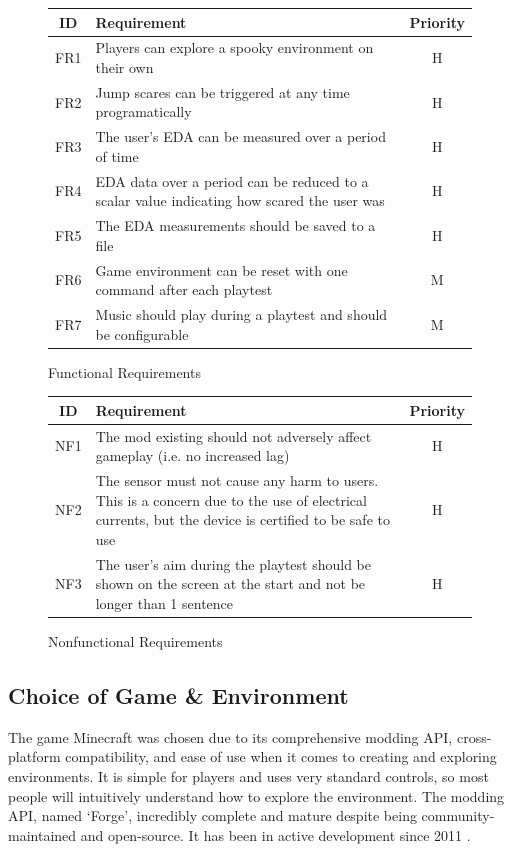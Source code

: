 \documentclass[12pt,a4paper]{article}
\begin{document}
\begin{figure}[!htbp]
	\begin{center}
		\begin{tabularx}{\linewidth}{c|Xc}
			\textbf{ID} & \textbf{Requirement} & \textbf{Priority}\\\hline
			FR1&Players can explore a spooky environment on their own&H\\
			FR2&Jump scares can be triggered at any time programatically&H\\
			FR3&The user's EDA can be measured over a period of time&H\\
			FR4&EDA data over a period can be reduced to a scalar value indicating how scared the user was&H\\
			FR5&The EDA measurements should be saved to a file&H\\
			FR6&Game environment can be reset with one command after each playtest&M\\
			FR7&Music should play during a playtest and should be configurable&M\\
		\end{tabularx}
		\caption{Functional Requirements}
	\end{center}
\end{figure}

\begin{figure}[!htbp]
	\begin{center}
		\begin{tabularx}{\linewidth}{c|Xc}
			\textbf{ID} & \textbf{Requirement} & \textbf{Priority}\\\hline
			NF1&The mod existing should not adversely affect gameplay (i.e. no increased lag)&H\\
			NF2&The sensor must not cause any harm to users. This is a concern due to the use of electrical currents, but the device is certified to be safe to use&H\\
			NF3&The user's aim during the playtest should be shown on the screen at the start and not be longer than 1 sentence&H\\
		\end{tabularx}
		\caption{Nonfunctional Requirements}
	\end{center}
\end{figure}

\FloatBarrier

\subsection{Choice of Game \& Environment}
The game Minecraft was chosen due to its comprehensive modding API, cross-platform compatibility, and ease of use when it comes to creating and exploring environments. It is simple for players and uses very standard controls, so most people will intuitively understand how to explore the environment. The modding API, named `Forge',  incredibly complete and mature despite being community-maintained and open-source. It has been in 
active development since 2011 \cite{ForgeGit}. 
\end{document}
